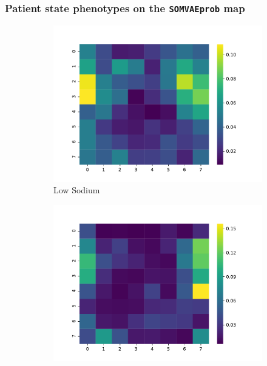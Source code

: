 \newpage


\subsubsection*{Patient state phenotypes on the \texttt{SOMVAEprob} map}

\begin{figure}[h!]
\centering
\begin{subfigure}[t]{0.22\textwidth}
\centering
\includegraphics[scale=0.22]{./figures/icu_somvaeprob/detail_heatmaps_low_sodium}
\caption{Low Sodium}
\end{subfigure}
\begin{subfigure}[t]{0.22\textwidth}
\centering
\includegraphics[scale=0.22]{./figures/icu_somvaeprob/detail_heatmaps_high_potassium}

\end{subfigure}
\end{figure}
